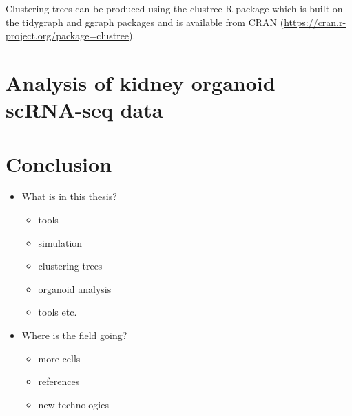 \documentclass[11pt,a4paper,titlepage,twoside,openright]{style/unimelbthesis}
\theoremstyle{definition}
\theoremstyle{definition}
\theoremstyle{definition}
\theoremstyle{remark}
\begin{document}
\begin{mainmatter}
Clustering trees can be produced using the clustree R package which is built on the tidygraph and ggraph packages and is available from CRAN (\url{https://cran.r-project.org/package=clustree}).

\hypertarget{analysis-of-kidney-organoid-scrna-seq-data}{%
\chapter{Analysis of kidney organoid scRNA-seq data}\label{analysis-of-kidney-organoid-scrna-seq-data}}

\hypertarget{conclusion}{%
\chapter{Conclusion}\label{conclusion}}

\begin{itemize}
\tightlist
\item
  What is in this thesis?

  \begin{itemize}
  \tightlist
  \item
    tools
  \item
    simulation
  \item
    clustering trees
  \item
    organoid analysis
  \item
    tools etc.
  \end{itemize}
\item
  Where is the field going?

  \begin{itemize}
  \tightlist
  \item
    more cells
  \item
    references
  \item
    new technologies
  \end{itemize}
\end{itemize}


\end{mainmatter}
\end{document}
